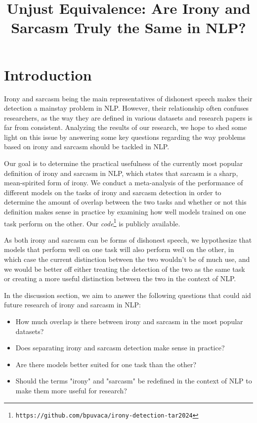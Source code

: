 \documentclass[10pt, a4paper]{article}
\title{Unjust Equivalence: Are Irony and Sarcasm Truly the Same in NLP?}
\begin{document}
\maketitleabstract

   


\section{Introduction}

Irony and sarcasm being the main representatives of dishonest speech makes their detection a mainstay problem in NLP. However,
their relationship often confuses researchers, as the way they are defined in various datasets and research papers is far from
consistent. Analyzing the results of our research, we hope to shed some light on this issue by answering some key questions regarding
the way problems based on irony and sarcasm should be tackled in NLP.

Our goal is to determine the practical usefulness of the currently most popular definition of irony and sarcasm in NLP, which
states that sarcasm is a sharp, mean-spirited form of irony. We conduct a meta-analysis of the performance of different
models on the tasks of irony and sarcasm detection in order to determine the amount of overlap between the two tasks and
whether or not this definition makes sense in practice by examining how well models trained on one task perform on the other.
Our \emph{code}\footnote{\scriptsize\texttt{https://github.com/bpuvaca/irony-detection-tar2024}} is publicly available.

As both irony and sarcasm 
can be forms of dishonest speech, 
we hypothesize that models that perform well on one task will also perform
well on the other, in which case the current distinction between the two wouldn't be of much use, and we would be better off
either treating the detection of the two as the same task or creating a more useful distinction between the two in the context
of NLP.

In the discussion section, we aim to answer the following questions that could aid future research of irony
and sarcasm in NLP:

\begin{itemize}
   \item How much overlap is there between irony and sarcasm in the most popular datasets?
   \item Does separating irony and sarcasm detection make sense in practice?
   \item Are there models better suited for one task than the other?
   \item Should the terms "irony" and "sarcasm" be redefined in the context of NLP to make them more useful for research?
\end{itemize}
\end{document}
